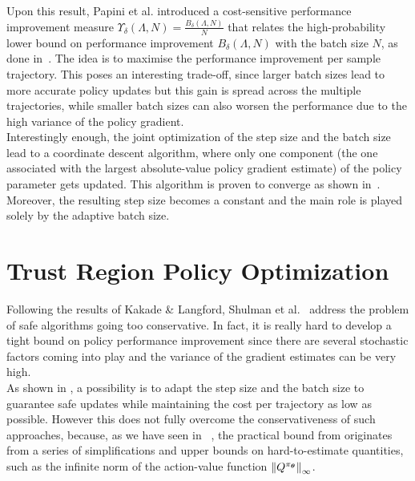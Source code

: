 Upon this result, Papini et al. introduced a cost-sensitive performance improvement measure $\Upsilon_\delta(\Lambda, N) = \frac{B_\delta(\Lambda, N)}{N}$ that relates the high-probability lower bound on performance improvement $B_\delta(\Lambda, N)$ with the batch size $N$, as done in~\cite{DBLP:journals/corr/abs-1712-03428}. The idea is to maximise the performance improvement per sample trajectory. This poses an interesting trade-off, since larger batch sizes lead to more accurate policy updates but this gain is spread across the multiple trajectories, while smaller batch sizes can also worsen the performance due to the high variance of the policy gradient.\\
Interestingly enough, the joint optimization of the step size and the batch size lead to a coordinate descent algorithm, where only one component (the one associated with the largest absolute-value policy gradient estimate) of the policy parameter gets updated. This algorithm is proven to converge as shown in~\cite{nutinicoordinate}. Moreover, the resulting step size becomes a constant and the main role is played solely by the adaptive batch size.

\section{Trust Region Policy Optimization}
\label{sec:trpo}
Following the results of Kakade \& Langford, Shulman et al.~\cite{trpo} address the problem of safe algorithms going too conservative. In fact, it is really hard to develop a tight bound on policy performance improvement since there are several stochastic factors coming into play and the variance of the gradient estimates can be very high.\\
As shown in , a possibility is to adapt the step size and the batch size to guarantee safe updates while maintaining the cost per trajectory as low as possible. However this does not fully overcome the conservativeness of such approaches, because, as we have seen in ~, the practical bound from  originates from a series of simplifications and upper bounds on hard-to-estimate quantities, such as the infinite norm of the action-value function $\norm[\infty]{Q^{\pi_{\vtheta}}}$.

